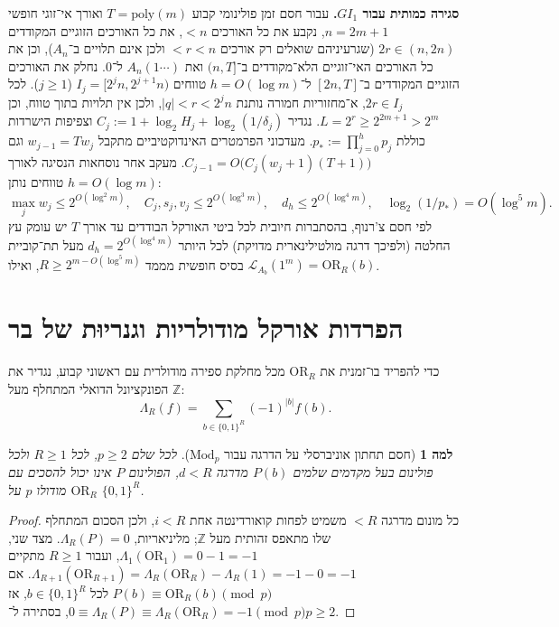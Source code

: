 \documentclass[11pt,a4paper]{article}
\newtheorem{lemma}[theorem]{למה}
\theoremstyle{definition}
\theoremstyle{remark}
\newcommand{\OR}{\mathrm{OR}}
\newcommand{\Z}{\mathbb{Z}}
\newcommand{\GI}{GI_1}
\begin{document}
\textbf{סגירה כמותית עבור $\GI$.} עבור חסם זמן פולינומי קבוע $T = \mathrm{poly}(m)$ ואורך אי־זוגי חופשי $n = 2m+1$, נקבע את כל האורכים $< n$, את כל האורכים הזוגיים המקודדים $2r \in (n, 2n)$ (שגרעיניהם שואלים רק אורכים $< r < n$ ולכן אינם תלויים ב־$A_n$), וכן את כל האורכים האי־זוגיים הלא־מקודדים ב־$(n, T]$ ואת $A_n(1\cdots)$ ל־$0$. נחלק את האורכים הזוגיים המקודדים ב־$[2n, T]$ ל־$h = O(\log m)$ טווחים $I_j = [2^j n, 2^{j+1} n)$ ($j \ge 1$). לכל $2r \in I_j$, א־מחזוריות חמורה נותנת $|q| < r < 2^j n$, ולכן אין תלויות בתוך טווח, וכן $L = 2^r \ge 2^{2m+1} > 2^m$. נגדיר $C_j := 1 + \log_2 H_j + \log_2(1/\delta_j)$ וצפיפות הישרדות כוללת $p_* := \prod_{j=0}^h p_j$. מעדכוני הפרמטרים האינדוקטיביים מתקבל $w_{j-1} = T w_j$ וגם $C_{j-1} = O\bigl(C_j (w_j + 1)(T + 1)\bigr)$. מעקב אחר נוסחאות הנסיגה לאורך $h = O(\log m)$ טווחים נותן:
\[
  \max_j w_j \le 2^{O(\log^2 m)},\quad
  C_j, s_j, v_j \le 2^{O(\log^3 m)},\quad
  d_h \le 2^{O(\log^4 m)},\quad
  \log_2(1/p_*) = O(\log^5 m).
\]
לפי חסם צ'רנוף, בהסתברות חיובית לכל ביטי האורקל הבודדים עד אורך $T$ יש עומק עץ החלטה (ולפיכך דרגה מולטילינארית מדויקת) לכל היותר $d_h = 2^{O(\log^4 m)}$ מעל תת־קוביית בסיס חופשית מממד $R \ge 2^{m - O(\log^5 m)}$, ואילו $\mathcal{L}_{A_b}(1^m) = \OR_R(b)$.

\section{הפרדות אורקל מודולריות וגנריוּת של בר}

כדי להפריד בו־זמנית את $\OR_R$ מכל מחלקת ספירה מודולרית עם ראשוני קבוע, נגדיר את הפונקציונל הדואלי המתחלף מעל $\Z$:
\[
  \Lambda_R(f) = \sum_{b \in \{0,1\}^R} (-1)^{|b|} f(b).
\]

\begin{lemma}[חסם תחתון אוניברסלי על הדרגה עבור $\mathrm{Mod}_p$]
\label{lem:modp-lb}
לכל שלם $p \ge 2$, לכל $R \ge 1$ ולכל פולינום בעל מקדמים שלמים $P(b)$ מדרגה $d < R$, הפולינום $P$ אינו יכול להסכים עם $\OR_R$ מודולו $p$ על $\{0,1\}^R$.
\end{lemma}

\begin{proof}
כל מונום מדרגה $< R$ משמיט לפחות קואורדינטה אחת $i < R$, ולכן הסכום המתחלף שלו מתאפס זהותית מעל $\Z$; מליניאריות, $\Lambda_R(P) = 0$. מצד שני, $\Lambda_1(\OR_1) = 0 - 1 = -1$, ועבור $R \ge 1$ מתקיים $\Lambda_{R+1}(\OR_{R+1}) = \Lambda_R(\OR_R) - \Lambda_R(1) = -1 - 0 = -1$. אם $P(b) \equiv \OR_R(b) \pmod p$ לכל $b \in \{0,1\}^R$, אז $0 \equiv \Lambda_R(P) \equiv \Lambda_R(\OR_R) = -1 \pmod p$, בסתירה ל־$p \ge 2$.
\end{proof}
\end{document}
